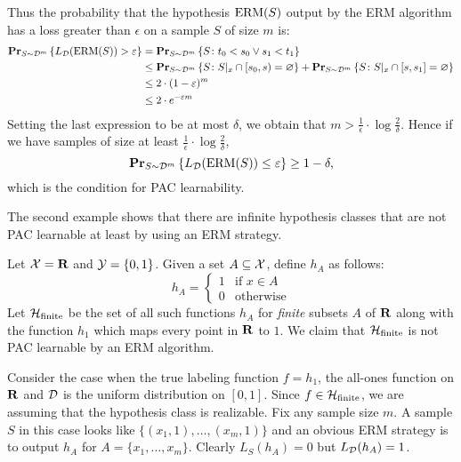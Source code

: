 \begin{example}
Thus the probability that the hypothesis $\operatorname{ERM}(S)$ output by the ERM algorithm
has a loss greater than $\epsilon$ on a sample $S$ of size $m$ is:
\begin{align*}
    \mathbf{Pr}_{S \sim \mathcal{D}^m} \left \{ L_{\mathcal{D}} (\operatorname{ERM}(S)) > \varepsilon \right \}
     & = \mathbf{Pr}_{S \sim \mathcal{D}^m} \left \{ S \colon t_0 < s_0 \vee s_1 < t_1 \right \} \\
     & \leq  \mathbf{Pr}_{S \sim \mathcal{D}^m} \left \{ S \colon S|_x \cap [s_0, s) = \varnothing \right \} +
             \mathbf{Pr}_{S \sim \mathcal{D}^m} \left \{ S \colon S|_x \cap [s, s_1] = \varnothing \right \} \\
     & \leq 2 \cdot (1 - \varepsilon)^m \\
     & \leq 2 \cdot e^{- \varepsilon m}
\end{align*}
Setting the last expression to be at most $\delta$, we obtain that
$m > \frac{1}{\epsilon} \cdot \log \frac{2}{\delta}$. Hence if we have samples
of size at least $\frac{1}{\epsilon} \cdot \log \frac{2}{\delta}$,
\[
    \mathbf{Pr}_{S \sim \mathcal{D}^m} \left \{ L_{\mathcal{D}} (\operatorname{ERM}(S)) \leq \varepsilon \right \} \geq 1 - \delta,
\]
which is the condition for PAC learnability.
\end{example}

The second example shows that there are infinite hypothesis classes that are not
PAC learnable at least by using an ERM strategy.

\begin{example}
Let $\mathcal{X} = \mathbf{R}$ and $\mathcal{Y} = \{0, 1\}$. Given a set $A \subseteq \mathcal{X}$,
define $h_A$ as follows:
\[
    h_A = \left \{ \begin{array}{ll}
                        1 & \text{if } x \in A \\
                        0 & \text{otherwise}
                   \end{array}\right .
\]
Let $\mathcal{H}_{\text{finite}}$ be the set of all such functions $h_A$ for \emph{finite}
subsets $A$ of $\mathbf{R}$ along with the function $h_{1}$ which maps every point in $\mathbf{R}$
to $1$. We claim that $\mathcal{H}_{\text{finite}}$ is not PAC learnable by an ERM algorithm.

Consider the case when the true labeling function $f = h_1$, the all-ones
function on $\mathbf{R}$ and $\mathcal{D}$ is the uniform distribution on $[0, 1]$. Since
$f \in \mathcal{H}_{\text{finite}}$, we are assuming that the hypothesis class is
realizable. Fix any sample size $m$. A sample $S$ in this case looks like
$\{(x_1, 1), \ldots, (x_m, 1)\}$ and an obvious ERM strategy is to output $h_A$
for $A = \{x_1, \ldots, x_m\}$. Clearly $L_S (h_A) = 0$ but $L_{\mathcal{D}} (h_A) =
1$.
\end{example}

